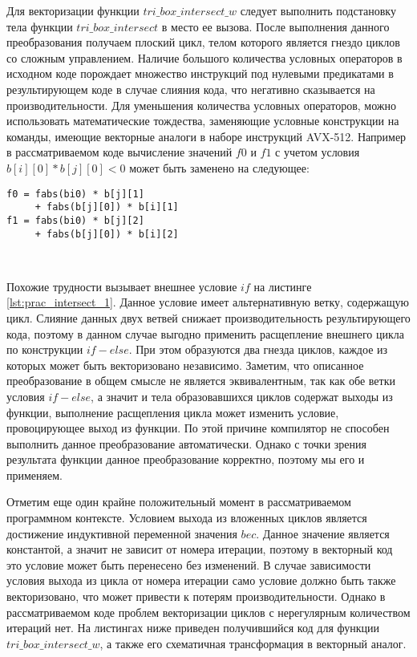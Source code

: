 \documentclass[
11pt,%
tightenlines,%
twoside,%
onecolumn,%
nofloats,%
nobibnotes,%
nofootinbib,%
superscriptaddress,%
noshowpacs,%
centertags]%
{revtex4}
\begin{document}
Для векторизации функции $tri\_box\_intersect\_w$ следует выполнить подстановку тела функции $tri\_box\_intersect$ в место ее вызова.
После выполнения данного преобразования получаем плоский цикл, телом которого является гнездо циклов со сложным управлением.
Наличие большого количества условных операторов в исходном коде порождает множество инструкций под нулевыми предикатами в результирующем коде в случае слияния кода, что негативно сказывается на производительности.
Для уменьшения количества условных операторов, можно использовать математические тождества, заменяющие условные конструкции на команды, имеющие векторные аналоги в наборе инструкций AVX-512.
Например в рассматриваемом коде вычисление значений $f0$ и $f1$ с учетом условия $b[i][0] * b[j][0] < 0$ может быть заменено на следующее:

\begin{lstlisting}[caption={Применение тождеств для использования векторных инструкций.},label={lst:prac_intersect_16_2}]
f0 = fabs(bi0) * b[j][1]
     + fabs(b[j][0]) * b[i][1]
f1 = fabs(bi0) * b[j][2]
     + fabs(b[j][0]) * b[i][2]
\end{lstlisting}

\

Похожие трудности вызывает внешнее условие $if$ на листинге \ref{lst:prac_intersect_1}.
Данное условие имеет альтернативную ветку, содержащую цикл.
Слияние данных двух ветвей снижает производительность результирующего кода, поэтому в данном случае выгодно применить расщепление внешнего цикла по конструкции $if-else$.
При этом образуются два гнезда циклов, каждое из которых может быть векторизовано независимо.
Заметим, что описанное преобразование в общем смысле не является эквивалентным, так как обе ветки условия $if-else$, а значит и тела образовавшихся циклов содержат выходы из функции, выполнение расщепления цикла может изменить условие, провоцирующее выход из функции.
По этой причине компилятор не способен выполнить данное преобразование автоматически.
Однако с точки зрения результата функции данное преобразование корректно, поэтому мы его и применяем.

Отметим еще один крайне положительный момент в рассматриваемом программном контексте.
Условием выхода из вложенных циклов является достижение индуктивной переменной значения $bec$.
Данное значение является константой, а значит не зависит от номера итерации, поэтому в векторный код это условие может быть перенесено без изменений.
В случае зависимости условия выхода из цикла от номера итерации само условие должно быть также векторизовано, что может привести к потерям производительности.
Однако в рассматриваемом коде проблем векторизации циклов с нерегулярным количеством итераций нет.
На листингах ниже приведен получившийся код для функции $tri\_box\_intersect\_w$, а также его схематичная трансформация в векторный аналог.
\end{document}
